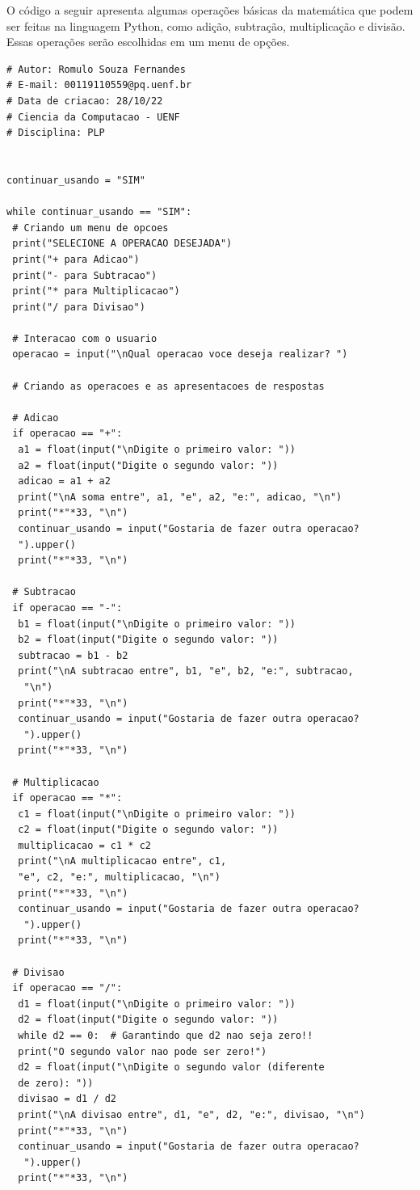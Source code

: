     O código a seguir apresenta algumas operações básicas da matemática que podem ser feitas na linguagem Python, como adição, subtração, multiplicação e divisão. Essas operações serão escolhidas em um menu de opções. 
	\begin{lstlisting}
# Autor: Romulo Souza Fernandes
# E-mail: 00119110559@pq.uenf.br
# Data de criacao: 28/10/22
# Ciencia da Computacao - UENF
# Disciplina: PLP
		
		
continuar_usando = "SIM"
		
while continuar_usando == "SIM":
 # Criando um menu de opcoes
 print("SELECIONE A OPERACAO DESEJADA")
 print("+ para Adicao")
 print("- para Subtracao")
 print("* para Multiplicacao")
 print("/ para Divisao")
		
 # Interacao com o usuario
 operacao = input("\nQual operacao voce deseja realizar? ")
		
 # Criando as operacoes e as apresentacoes de respostas
		
 # Adicao
 if operacao == "+":
  a1 = float(input("\nDigite o primeiro valor: "))
  a2 = float(input("Digite o segundo valor: "))
  adicao = a1 + a2
  print("\nA soma entre", a1, "e", a2, "e:", adicao, "\n")
  print("*"*33, "\n")
  continuar_usando = input("Gostaria de fazer outra operacao? 
  ").upper()
  print("*"*33, "\n")
		
 # Subtracao
 if operacao == "-":
  b1 = float(input("\nDigite o primeiro valor: "))
  b2 = float(input("Digite o segundo valor: "))
  subtracao = b1 - b2
  print("\nA subtracao entre", b1, "e", b2, "e:", subtracao,
   "\n")
  print("*"*33, "\n")
  continuar_usando = input("Gostaria de fazer outra operacao?
   ").upper()
  print("*"*33, "\n")
		
 # Multiplicacao
 if operacao == "*":
  c1 = float(input("\nDigite o primeiro valor: "))
  c2 = float(input("Digite o segundo valor: "))
  multiplicacao = c1 * c2
  print("\nA multiplicacao entre", c1,
  "e", c2, "e:", multiplicacao, "\n")
  print("*"*33, "\n")
  continuar_usando = input("Gostaria de fazer outra operacao?
   ").upper()
  print("*"*33, "\n")
		
 # Divisao
 if operacao == "/":
  d1 = float(input("\nDigite o primeiro valor: "))
  d2 = float(input("Digite o segundo valor: "))
  while d2 == 0:  # Garantindo que d2 nao seja zero!!
  print("O segundo valor nao pode ser zero!")
  d2 = float(input("\nDigite o segundo valor (diferente 
  de zero): "))
  divisao = d1 / d2
  print("\nA divisao entre", d1, "e", d2, "e:", divisao, "\n")
  print("*"*33, "\n")
  continuar_usando = input("Gostaria de fazer outra operacao?
   ").upper()
  print("*"*33, "\n")
	\end{lstlisting}

